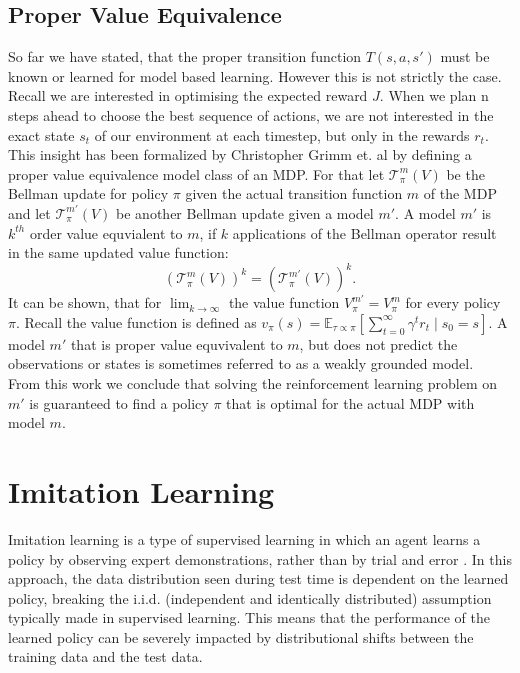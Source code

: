 \subsection{Proper Value Equivalence}
So far we have stated, that the proper transition function $T(s,a,s')$ must be known or learned for model based learning. However this is not strictly the case. Recall we are 
interested in optimising the expected reward $J$. When we plan n steps ahead to choose the best sequence of actions, we are not interested in the exact state $s_t$ 
of our environment at each timestep, but only in the rewards $r_t$. \\
This insight has been formalized by Christopher Grimm et. al \cite{grimm2021proper} by defining a proper value equivalence model class of an MDP. For that 
let $\mathcal{T}^m_{\pi}(V)$ be the Bellman update for policy $\pi$ given the actual transition function $m$ of the MDP and let 
$\mathcal{T}^{m'}_{\pi}(V)$ be another Bellman update given a model $m'$. A model $m'$ is $k^{th}$ order value equvialent to $m$, 
if $k$ applications of the Bellman operator result in the same updated value function: 
\begin{equation}
    \label{eq_kthVE}
    \left(\mathcal{T}^{m}_{\pi}(V)\right)^k = \left(\mathcal{T}^{m'}_{\pi}(V)\right)^k.
\end{equation}
It can be shown, that for $\lim_{k \rightarrow \infty}$ the value function $V_{\pi}^{m'} = V_{\pi}^m$ for every policy $\pi$. Recall the value function is 
defined as $v_{\pi}(s) = \mathbb{E}_{\tau \propto \pi}\left[\sum_{t=0}^{\infty} \gamma^t r_t \mid s_0 = s\right]$. A model $m'$ that is proper value 
equvivalent to $m$, but does not predict the observations or states is sometimes referred to as a weakly grounded model.\\ 
From this work we conclude that solving the 
reinforcement learning problem on $m'$ is guaranteed to find a policy $\pi$ that is optimal for the actual MDP with model $m$. 

\section{Imitation Learning}
Imitation learning is a type of supervised learning in which an agent learns a policy by observing expert demonstrations, 
rather than by trial and error \cite{IL}. In this approach, the data distribution seen during test time is dependent on the learned policy, 
breaking the i.i.d. (independent and identically distributed) assumption typically made in supervised learning. This means that the performance of the 
learned policy can be severely impacted by distributional shifts between the training data and the test data. \\ \\

